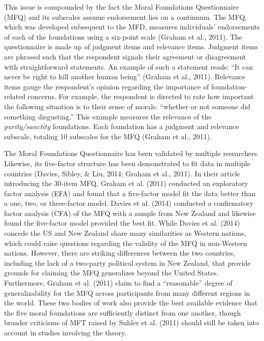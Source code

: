 \documentclass[english,,man]{apa6}
\begin{document}
This issue is compounded by the fact the Moral Foundations Questionnaire
(MFQ) and its subscales assume endorsement lies on a continuum. The MFQ,
which was developed subsequent to the MFD, measures individuals'
endorsements of each of the foundations using a six-point scale (Graham
et al., 2011). The questionnaire is made up of judgment items and
relevance items. Judgment items are phrased such that the respondent
signals their agreement or disagreement with straightforward statements.
An example of such a statement reads: \enquote{It can never be right to
kill another human being} (Graham et al., 2011). Relevance items gauge
the respondent's opinion regarding the importance of foundation-related
concerns. For example, the respondent is directed to rate how important
the following situation is to their sense of morals: \enquote{whether or
not someone did something disgusting.} This example measures the
relevance of the \emph{purity/sanctity} foundations. Each foundation has
a judgment and relevance subscale, totaling 10 subscales for the MFQ
(Graham et al., 2011).

The Moral Foundations Questionnaire has been validated by multiple
researchers. Likewise, its five-factor structure has been demonstrated
to fit data in multiple countries (Davies, Sibley, \& Liu, 2014; Graham
et al., 2011). In their article introducing the 30-item MFQ, Graham et
al. (2011) conducted an exploratory factor analysis (EFA) and found that
a five-factor model fit the data better than a one, two, or three-factor
model. Davies et al. (2014) conducted a confirmatory factor analysis
(CFA) of the MFQ with a sample from New Zealand and likewise found the
five-factor model provided the best fit. While Davies et al. (2014)
concede the US and New Zealand share many similarities as Western
nations, which could raise questions regarding the validity of the MFQ
in non-Western nations. However, there are striking differences between
the two countries, including the lack of a two-party political system in
New Zealand, that provide grounds for claiming the MFQ generalizes
beyond the United States. Furthermore, Graham et al. (2011) claim to
find a \enquote{reasonable} degree of generalizability for the MFQ
across participants from many different regions in the world. These two
bodies of work also provide the best available evidence that the five
moral foundations are sufficiently distinct from one another, though
broader criticisms of MFT raised by Suhler et al. (2011) should still be
taken into account in studies involving the theory.
\end{document}
